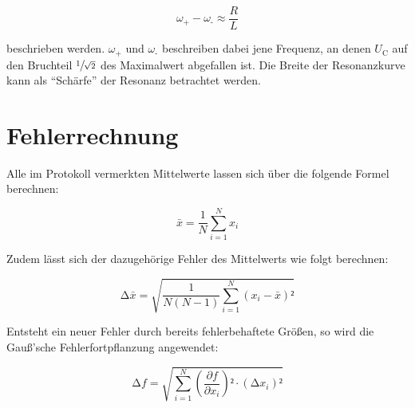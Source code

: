 \begin{equation*}
    \omega_\text{+} - \omega_\text{-} \approx \frac{R}{L}
\end{equation*}

\noindent beschrieben werden. $\omega_\text{+}$ und $\omega_\text{-}$ beschreiben dabei jene Frequenz, an denen $U_\text{C}$ auf den 
Bruchteil $\sfrac{1}{\sqrt{2}}$ des Maximalwert abgefallen ist. Die Breite der Resonanzkurve kann als \enquote{Schärfe} der 
Resonanz betrachtet werden.


\section{Fehlerrechnung}
\label{sec:Fehlerrechnung}

Alle im Protokoll vermerkten Mittelwerte lassen sich über die folgende Formel berechnen:

\begin{equation}
\label{eqn:Mittelwert}
    \bar{x} = \frac{1}{N}\sum_{i=1}^N x_i
\end{equation}

Zudem lässt sich der dazugehörige Fehler des Mittelwerts wie folgt berechnen:

\begin{equation}
\label{eqn:Mittelwertfehler}
    \increment \bar{x} = \sqrt{\frac{1}{N\left(N-1\right)}\sum_{i=1}^N \left(x_i - \bar{x}\right)²}
\end{equation}

Entsteht ein neuer Fehler durch bereits fehlerbehaftete Größen, so wird die Gauß'sche Fehlerfortpflanzung angewendet:

\begin{equation}
\label{eqn:Fehlerfortpflanzung}
    \increment f = \sqrt{\sum_{i=1}^N \left(\frac{\partial f}{\partial x_i}\right)²\cdot\left(\increment x_i\right)²}
\end{equation}

